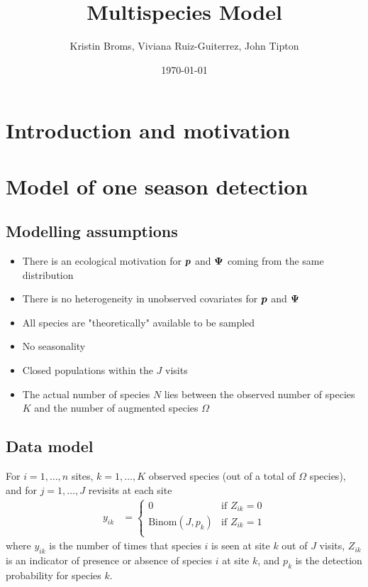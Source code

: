 \documentclass[fleqn]{article}
\title{Multispecies Model}
\author{Kristin Broms, Viviana Ruiz-Guiterrez, John Tipton}
\date{\today}
\def\bm#1{\mbox{\boldmath $#1$}}
\begin{document}
%
\maketitle
%
\section{Introduction and motivation}
%
\section{Model of one season detection}
%
\subsection{Modelling assumptions}
%
\begin{itemize}
  \item There is an ecological motivation for $\bm{p}$ and $\bm{\Psi}$ coming from the same distribution
  \item There is no heterogeneity in unobserved covariates for $\bm{p}$ and $\bm{\Psi}$
  \item All species are "theoretically" available to be sampled
  \item No seasonality
  \item Closed populations within the $J$ visits
  \item The actual number of species $N$ lies between the observed number of species $K$ and the number of augmented species $\Omega$
\end{itemize}
%
\subsection{Data model}
%
For $i = 1, \ldots, n$ sites,  $k = 1, \ldots, K$ observed species (out of a total of $\Omega$ species), and for $j = 1, \ldots, J$ revisits at each site
%
\begin{align*}
  y_{ik} & = 
    \begin{cases}
      0 & \mbox{if } Z_{ik} = 0\\
      \mbox{Binom}(J, p_k) & \mbox{if } Z_{ik} = 1\\
    \end{cases}
\end{align*}
%
where $y_{ik}$ is the number of times that species $i$ is seen at site $k$ out of $J$ visits, $Z_{ik}$ is an indicator of presence or absence of species $i$ at site $k$, and $p_k$ is the detection probability for species $k$.
%
\end{document}
